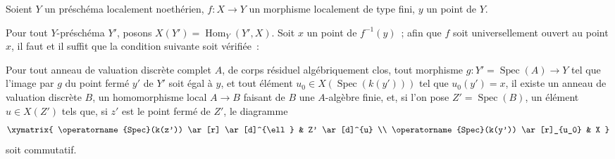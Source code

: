 \begin{proposition}[14.5.8]
\label{IV.14.5.8-fr}
Soient $Y$ un préschéma localement noethérien, $f:X\to Y$ un morphisme localement
de type fini, $y$ un point de $Y$.

Pour tout $Y$-préschéma $Y'$, posons $X(Y')=\operatorname{Hom}_Y(Y',X)$. Soit $x$ un point de
$f^{-1}(y)$~; afin que $f$ soit universellement ouvert au point $x$, il faut et il
suffit que la condition suivante soit vérifiée~:

Pour tout anneau de valuation discrète complet $A$, de corps résiduel
algébriquement clos, tout morphisme $g:Y'=\operatorname{Spec}(A)\to Y$ tel que l'image par $g$ du
point fermé $y'$ de $Y'$ soit égal à $y$, et tout élément
$u_0\in X(\operatorname{Spec}(k(y')))$ tel que $u_0(y')=x$, il existe un anneau de valuation
discrète $B$, un homomorphisme local $A\to B$ faisant de $B$ une $A$-algèbre finie,
et, si l'on pose $Z'=\operatorname{Spec}(B)$, un élément $u\in X(Z')$ tels que, si $z'$ est le
point fermé de $Z'$, le diagramme
\[
  \xymatrix{
    \operatorname{Spec}(k(z')) \ar[r] \ar[d]^{\ell} & Z' \ar[d]^{u} \\
    \operatorname{Spec}(k(y')) \ar[r]_{u_0} & X
  }
\]
soit commutatif.
\end{proposition}

